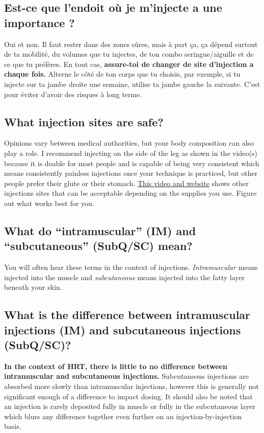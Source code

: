 \documentclass{article}
\begin{document}
\subsection{Est-ce que l'endoit où je m'injecte a une importance ?}

Oui et non. Il faut rester dans des zones sûres, mais à part ça, ça dépend surtout de ta mobilité, du volumes que tu injectes, de ton combo seringue/aiguille et de ce que tu préfères. En tout cas, \textbf{assure-toi de changer de site d'injection a chaque fois.} Alterne le côté de ton corps que tu choisis, par exemple, si tu injecte sur ta jambe droite une semaine, utilise ta jambe gauche la suivante. C'est pour éviter d'avoir des risques à long terme.

\subsection{What injection sites are safe?}

Opinions vary between medical authorities, but your body composition can also play a role. I recommend injecting on the side of the leg as shown in the video(s) because it is doable for most people and is capable of being very consistent which means consistently painless injections once your technique is practiced, but other people prefer their glute or their stomach. \href{https://vertisis.com/articles/how-to-self-administer-a-subcutaneous-injection}{This video and website} shows other injections sites that can be acceptable depending on the supplies you use. Figure out what works best for you.

\subsection{What do “intramuscular” (IM) and “subcutaneous” (SubQ/SC) mean?}

You will often hear these terms in the context of injections. \textit{Intramuscular} means injected into the muscle and \textit{subcutaneous} means injected into the fatty layer beneath your skin.

\subsection{What is the difference between intramuscular injections (IM) and subcutaneous injections (SubQ/SC)?}

\textbf{In the context of HRT, there is little to no difference between intramuscular and subcutaneous injections.} Subcutaneous injections are absorbed more slowly than intramuscular injections, however this is generally not significant enough of a difference to impact dosing. It should also be noted that an injection is rarely deposited fully in muscle or fully in the subcutaneous layer which blurs any difference together even further on an injection-by-injection basis.
\end{document}
